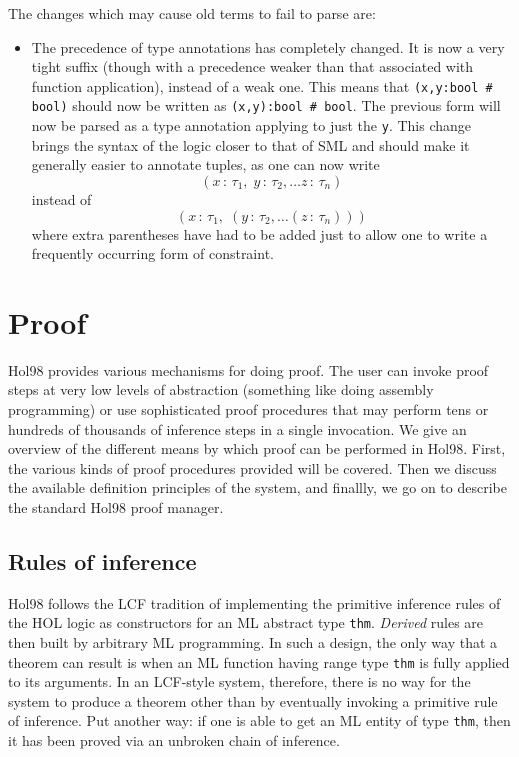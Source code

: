 \documentclass[12pt,fleqn,a4paper]{report}
\begin{document}
The changes which may cause old terms to fail to parse are:
\begin{itemize}
\item The precedence of type annotations has completely changed.  It
  is now a very tight suffix (though with a precedence weaker than
  that associated with function application), instead of a weak one.
  This means that \mbox{\tt (x,y:bool \# bool)} should now be written
  as \mbox{\tt (x,y):bool \# bool}. The previous form will now be
  parsed as a type annotation applying to just the \verb+y+.  This
  change brings the syntax of the logic closer to that of SML and
  should make it generally easier to annotate tuples, as one can now
  write \[ (x\,:\,\tau_1,\;y\,:\,\tau_2,\dots z\,:\,\tau_n)
  \] instead of \[
  (x\,:\,\tau_1, \;(y\,:\,\tau_2, \dots (z\,:\,\tau_n)))
  \] where extra parentheses have had to be added just to allow one to
  write a frequently occurring form of constraint.
\end{itemize}

\chapter{Proof}

 Hol98 provides various mechanisms for doing proof. The user can invoke
 proof steps at very low levels of abstraction (something like doing
 assembly programming) or use sophisticated proof procedures that may
 perform tens or hundreds of thousands of inference steps in a single
 invocation. We give an overview of the different means by which proof
 can be performed in Hol98. First, the various kinds of proof procedures
 provided will be covered. Then we discuss the available definition
 principles of the system, and finallly, we go on to describe the
 standard Hol98 proof manager.

\section{Rules of inference}

 Hol98 follows the LCF tradition of implementing the primitive inference
 rules of the HOL logic as constructors for an ML abstract type
 \verb+thm+. {\it Derived\/} rules are then built by arbitrary ML
 programming. In such a design, the only way that a theorem can result is
 when an ML function having range type \verb+thm+ is fully applied to its
 arguments. In an LCF-style system, therefore, there is no way for the
 system to produce a theorem other than by eventually invoking a
 primitive rule of inference. Put another way: if one is able to get an
 ML entity of type \verb+thm+, then it has been proved via an unbroken
 chain of inference.
\end{document}
